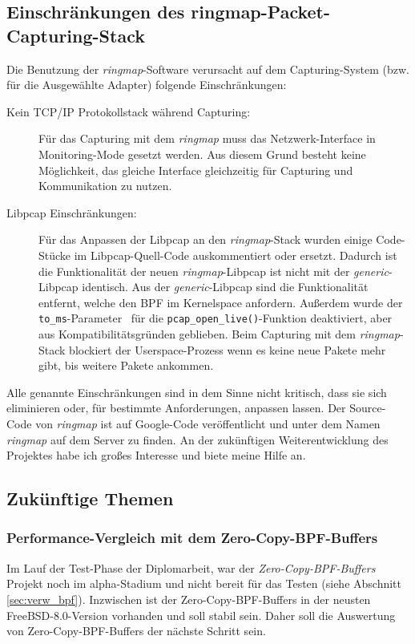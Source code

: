 \subsection{Einschränkungen des ringmap-Packet-Capturing-Stack}\label{sec:einschr}
Die Benutzung der \emph{ringmap}-Software verursacht auf dem Capturing-System
(bzw. für die Ausgewählte Adapter) folgende Einschränkungen:
\begin{description}
	\item [Kein TCP/IP Protokollstack während Capturing:] Für das 
		Capturing mit dem \emph{ringmap} muss das Netzwerk-Interface in
		Monitoring-Mode gesetzt werden. Aus diesem Grund besteht keine 
		Möglichkeit, das gleiche Interface gleichzeitig für Capturing 
		und Kommunikation zu nutzen.
	\item [Libpcap Einschränkungen:] Für das Anpassen der Libpcap an den \emph{ringmap}-Stack wurden einige Code-Stücke im
		Libpcap-Quell-Code auskommentiert oder ersetzt. Dadurch ist die
		Funktionalität der neuen \emph{ringmap}-Libpcap ist nicht mit
		der \emph{generic}-Libpcap identisch. Aus der
		\emph{generic}-Libpcap sind die Funktionalität entfernt, welche den
		BPF im Kernelspace anfordern. Außerdem wurde der
		\verb+to_ms+-Parameter~\cite{man_pcap} für die
		\verb+pcap_open_live()+-Funktion deaktiviert, aber aus 
		Kompatibilitätsgründen geblieben. Beim
		Capturing mit dem \emph{ringmap}-Stack blockiert der Userspace-Prozess wenn
		es keine neue Pakete mehr gibt, bis  weitere Pakete ankommen.
\end{description}
Alle genannte Einschränkungen sind  in dem Sinne nicht kritisch, dass 
sie sich eliminieren oder, für bestimmte Anforderungen, anpassen lassen. 
Der Source-Code von \emph{ringmap} ist auf Google-Code veröffentlicht 
und unter dem Namen \emph{ringmap} auf dem Server zu finden. An der  zukünftigen 
Weiterentwicklung des Projektes habe ich großes Interesse und biete meine Hilfe an.

\subsection{Zukünftige Themen}
\subsubsection{Performance-Vergleich mit dem Zero-Copy-BPF-Buffers}
Im Lauf der Test-Phase der Diplomarbeit, war der \emph{Zero-Copy-BPF-Buffers}
Projekt noch im alpha-Stadium und nicht bereit für das Testen (siehe Abschnitt
\ref{sec:verw_bpf}). Inzwischen ist der Zero-Copy-BPF-Buffers in der neusten
FreeBSD-8.0-Version vorhanden und soll stabil sein. Daher soll die Auswertung 
von Zero-Copy-BPF-Buffers der nächste Schritt sein.

